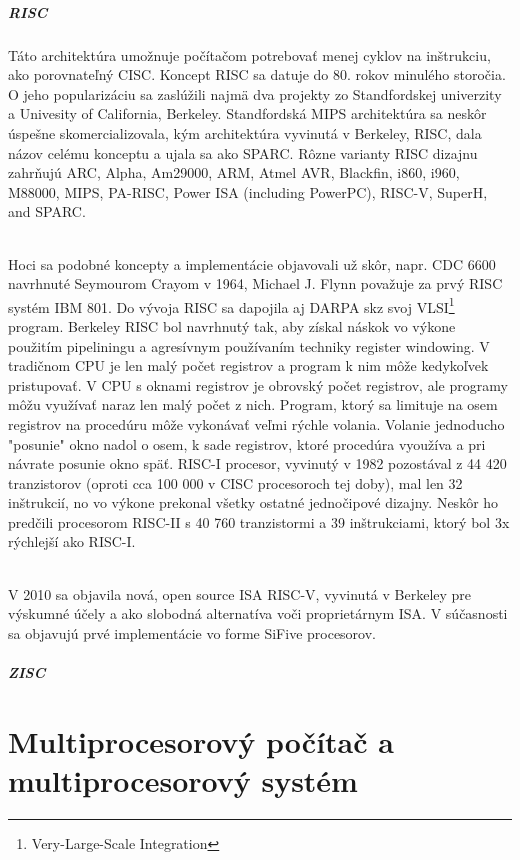 \documentclass[11pt,a4paper]{report}
\begin{document}
\paragraph{RISC} Táto architektúra umožnuje počítačom potrebovať menej cyklov na inštrukciu, ako porovnateľný CISC. Koncept RISC sa datuje do 80. rokov minulého storočia. O jeho popularizáciu sa zaslúžili najmä dva projekty zo Standfordskej univerzity a Univesity of California, Berkeley. Standfordská MIPS architektúra sa neskôr úspešne skomercializovala, kým architektúra vyvinutá v Berkeley, RISC, dala názov celému konceptu a ujala sa ako SPARC. Rôzne varianty RISC dizajnu zahrňujú  ARC, Alpha, Am29000, ARM, Atmel AVR, Blackfin, i860, i960, M88000, MIPS, PA-RISC, Power ISA (including PowerPC), RISC-V, SuperH, and SPARC.

\subparagraph{} Hoci sa podobné koncepty a implementácie objavovali už skôr, napr. CDC 6600 navrhnuté Seymourom Crayom v 1964, Michael J. Flynn považuje za prvý RISC systém IBM 801. Do vývoja RISC sa dapojila aj DARPA skz svoj VLSI\footnote{Very-Large-Scale Integration} program. Berkeley RISC bol navrhnutý tak, aby získal náskok vo výkone použitím pipeliningu a agresívnym používaním techniky register windowing. V tradičnom CPU je len malý počet registrov a program k nim môže kedykoľvek pristupovať. V CPU s oknami registrov je obrovský počet registrov, ale programy môžu využívať naraz len malý počet z nich. Program, ktorý sa limituje na osem registrov na procedúru môže vykonávať veľmi rýchle volania. Volanie jednoducho "posunie" okno nadol o osem, k sade registrov, ktoré procedúra vyoužíva a pri návrate posunie okno späť. RISC-I procesor, vyvinutý v 1982 pozostával z 44 420 tranzistorov (oproti cca 100 000 v CISC procesoroch tej doby), mal len 32 inštrukcií, no vo výkone prekonal všetky ostatné jednočipové dizajny. Neskôr ho predčili procesorom RISC-II s 40 760 tranzistormi a 39 inštrukciami, ktorý bol 3x rýchlejší ako RISC-I.

\subparagraph{} V 2010 sa objavila nová, open source ISA RISC-V, vyvinutá v Berkeley pre výskumné účely a ako slobodná alternatíva voči proprietárnym ISA. V súčasnosti sa objavujú prvé implementácie vo forme SiFive procesorov.


\paragraph{ZISC}



 


\chapter{Multiprocesorový počítač a multiprocesorový systém}
\end{document}
